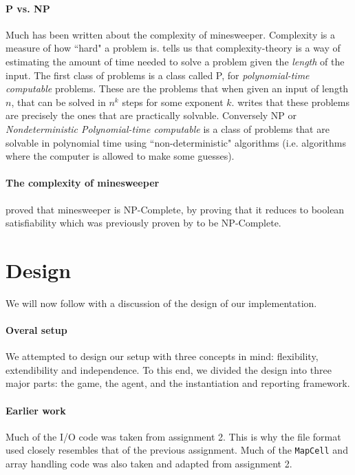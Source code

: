 \documentclass[british]{article}
\newcommand{\code}[1]{\texttt{#1}}
\begin{document}
\paragraph{P vs. NP} Much has been written about the complexity of minesweeper. Complexity is a measure of how ``hard" a problem is. \cite{Kaye00} tells us that complexity-theory is a way of estimating the amount of time needed to solve a problem given the \textit{length} of the input. The first class of problems is a class called P, for \textit{polynomial-time computable} problems. These are the problems that when given an input of length $n$, that can be solved in $n^k$ steps for some exponent $k$. \citeauthor{Kaye00} writes that these problems are precisely the ones that are practically solvable. Conversely NP or \textit{Nondeterministic Polynomial-time computable} is a class of problems that are solvable in polynomial time using ``non-deterministic" algorithms (i.e. algorithms where the computer is allowed to make some guesses).  

\paragraph{The complexity of minesweeper} \cite{Kaye00} proved that minesweeper is NP-Complete, by proving that it reduces to boolean satisfiability which was previously proven by \cite{Cook71} to be NP-Complete. 
 
\section{Design}
\label{design}
We will now follow with a discussion of the design of our implementation. 
\paragraph{Overal setup} We attempted to design our setup with three concepts in mind: flexibility, extendibility and independence. To this end, we divided the design into three major parts: the game, the agent, and the instantiation and reporting framework. 

\paragraph{Earlier work} Much of the I/O code was taken from assignment 2. This is why the file format used closely resembles that of the previous assignment. Much of the \code{MapCell} and array handling code was also taken and adapted from assignment 2. 
\end{document}
